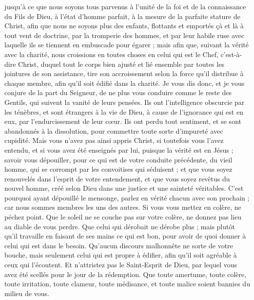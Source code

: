 \begin{multicols}{2}
jusqu'à ce que nous soyons tous parvenus à l'unité de la foi et de la connaissance du Fils de Dieu, à l'état d'homme parfait, à la mesure de la parfaite stature de Christ,
afin que nous ne soyons plus des enfants, flottants et emportés çà et là à tout vent de doctrine, par la tromperie des hommes, et par leur habile ruse avec laquelle ils se tiennent en embuscade pour égarer ;
mais afin que, suivant la vérité avec la charité, nous croissions en toutes choses en celui qui est le Chef, c'est-à-dire Christ,
duquel tout le corps bien ajusté et lié ensemble par toutes les jointures de son assistance, tire son accroissement selon la force qu'il distribue à chaque membre, afin qu'il soit édifié dans la charité.
Je vous dis donc, et je vous conjure de la part du Seigneur, de ne plus vous conduire comme le reste des Gentils, qui suivent la vanité de leurs pensées.
Ils ont l'intelligence obscurcie par les ténèbres, et sont étrangers à la vie de Dieu, à cause de l'ignorance qui est en eux, par l'endurcissement de leur cœur.
Ils ont perdu tout sentiment, et se sont abandonnés à la dissolution, pour commettre toute sorte d'impureté avec cupidité.
Mais vous n'avez pas ainsi appris Christ,
si toutefois vous l'avez entendu, et si vous avez été enseignés par lui, puisque la vérité est en Jésus ; 
savoir vous dépouiller, pour ce qui est de votre conduite précédente, du vieil homme, qui se corrompt par les convoitises qui séduisent ; 
et que vous soyez renouvelés dans l'esprit de votre entendement,
et que vous soyez revêtus du nouvel homme, créé selon Dieu dans une justice et une sainteté véritables.
C'est pourquoi ayant dépouillé le mensonge, parlez en vérité chacun avec son prochain ; car nous sommes membres les uns des autres.
Si vous vous mettez en colère, ne péchez point. Que le soleil ne se couche pas sur votre colère,
ne donnez pas lieu au diable de vous perdre.
Que celui qui dérobait ne dérobe plus ; mais plutôt qu'il travaille en faisant de ses mains ce qui est bon, pour avoir de quoi donner à celui qui est dans le besoin.
Qu'aucun discours malhonnête ne sorte de votre bouche, mais seulement celui qui est propre à édifier, afin qu'il soit agréable à ceux qui l'écoutent.
Et n'attristez pas le Saint-Esprit de Dieu, par lequel vous avez été scellés pour le jour de la rédemption.
Que toute amertume, toute colère, toute irritation, toute clameur, toute médisance, et toute malice soient bannies du milieu de vous.

\end{multicols}
